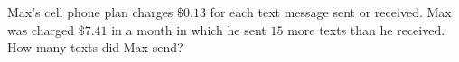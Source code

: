 Max's cell phone plan charges $\$0.13$ for each text message sent or received. Max was charged $\$7.41$ in a month in which he sent $15$ more texts than he received. How many texts did Max send?
